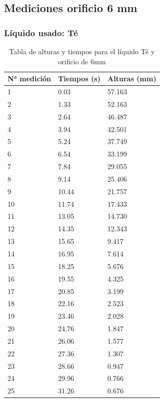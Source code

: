 \documentclass{article}
\begin{document}
\subsection{Mediciones orificio 6 mm}
\subsubsection{Líquido usado: Té}

\begin{table}[H]
    \begin{center}
        \begin{tabular}{ | m{2cm} | m{2cm} | m{2cm} | }
            \hline N° medición & Tiempos (s) & Alturas (mm) \\ 
            \hline 1 & 0.03 & 57.163 \\
            \hline 2 & 1.33 & 52.163 \\
            \hline 3 & 2.64 & 46.487 \\
            \hline 4 & 3.94 & 42.501 \\
            \hline 5 & 5.24 & 37.749 \\
            \hline 6 & 6.54 & 33.199 \\
            \hline 7 & 7.84 & 29.055 \\
            \hline 8 & 9.14 & 25.406 \\
            \hline 9 & 10.44 & 21.757 \\
            \hline 10 & 11.74 & 17.433 \\
            \hline 11 & 13.05 & 14.730 \\
            \hline 12 & 14.35 & 12.343 \\
            \hline 13 & 15.65 & 9.417 \\
            \hline 14 & 16.95 & 7.614 \\
            \hline 15 & 18.25 & 5.676 \\
            \hline 16 & 19.55 & 4.325 \\
            \hline 17 & 20.85 & 3.199 \\
            \hline 18 & 22.16 & 2.523 \\
            \hline 19 & 23.46 & 2.028 \\
            \hline 20 & 24.76 & 1.847 \\
            \hline 21 & 26.06 & 1.577 \\
            \hline 22 & 27.36 & 1.307 \\
            \hline 23 & 28.66 & 0.947 \\
            \hline 24 & 29.96 & 0.766 \\
            \hline 25 & 31.26 & 0.676 \\
            \hline
        \end{tabular}
    \end{center}
    \caption{Tabla de alturas y tiempos para el líquido Té y orificio de 6mm}
\end{table}
\end{document}
